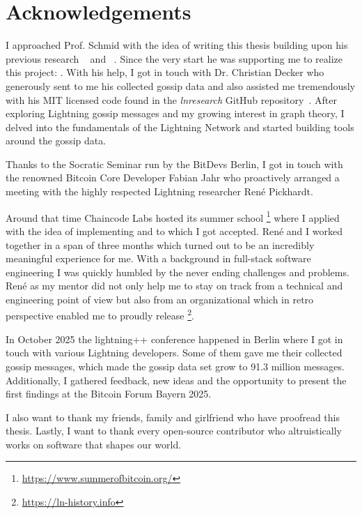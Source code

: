 \section*{Acknowledgements}

I approached Prof. Schmid with the idea of writing this thesis building upon his previous research  ~\cite{zabka_empirical_2022} and  ~\cite{zabka_short_2022}.
Since the very start he was supporting me to realize this project: .
With his help, I got in touch with Dr. Christian Decker who generously sent to me his collected gossip data and 
also assisted me tremendously with his MIT licensed code found in the \textit{lnresearch} GitHub repository~\cite{decker_lnresearch_2020}.
After exploring Lightning gossip messages and my growing interest in graph theory,
I delved into the fundamentals of the Lightning Network and started building tools around the gossip data.

Thanks to the Socratic Seminar run by the BitDevs Berlin, I got in touch with the renowned Bitcoin Core Developer Fabian Jahr
who proactively arranged a meeting with the highly respected Lightning researcher René Pickhardt.

Around that time Chaincode Labs hosted its summer school \footnote{\url{https://www.summerofbitcoin.org/}} where I applied
with the idea of implementing  and to which I got accepted.
René and I worked together in a span of three months which turned out to be an incredibly meaningful experience for me.
With a background in full-stack software engineering I was quickly humbled by the never ending challenges and problems.
René as my mentor did not only help me to stay on track from a technical and engineering point of view 
but also from an organizational which in retro perspective enabled me to proudly release  \footnote{\url{https://ln-history.info}}.

In October 2025 the lightning++ conference happened in Berlin where I got in touch with various Lightning developers.
Some of them gave me their collected gossip messages, which made the  gossip data set grow to \num{91.3} million messages.
Additionally, I gathered feedback, new ideas and the opportunity to present the first findings at the Bitcoin Forum Bayern 2025.

I also want to thank my friends, family and girlfriend who have proofread this thesis.
Lastly, I want to thank every open-source contributor who altruistically works on software that shapes our world.